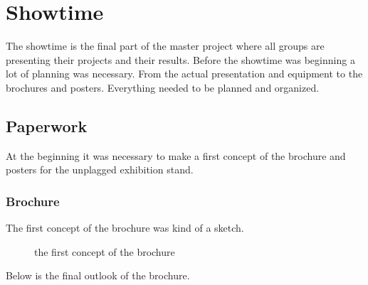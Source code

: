 \chapter{Showtime}\label{chap:Showtime}

The showtime is the final part of the master project where all groups are presenting their projects and their results.
Before the showtime was beginning a lot of planning was necessary. From the actual presentation and equipment to the brochures and posters. Everything needed to be planned and organized.

\section{Paperwork}
At the beginning it was necessary to make a first concept of the brochure and posters for the unplagged exhibition stand.

\subsection{Brochure}
The first concept of the brochure was kind of a sketch.

\begin{figure}[!h]
  \centering
  \caption{the first concept of the brochure}
  \label{fig:brochure_sketch}
\end{figure}

Below is the final outlook of the brochure.

